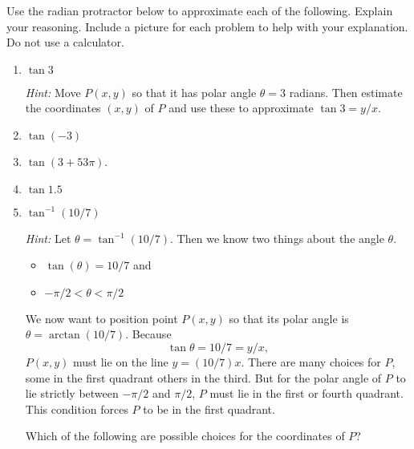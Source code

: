 \documentclass{ximera}
\begin{document}
\begin{question} \label{Q10:InverseTrig}
Use the radian protractor below to approximate each of the following. Explain your reasoning. Include a picture for each problem to help with your explanation. Do not use a calculator.

\begin{enumerate}

\item $\tan 3$

\emph{Hint: } Move $P(x,y)$ so that it has polar angle $\theta =3$ radians. Then estimate the coordinates $(x,y)$ of $P$ and use these to approximate $\tan 3 = y/x$.

\item $\tan (-3)$

\item $\tan (3+53\pi)$.

\item $\tan 1.5$

\item $\tan^{-1}(10/7)$

\emph{Hint: } Let $\theta = \tan^{-1}(10/7)$. Then we know two things about the angle $\theta$.
\begin{itemize}
\item{$\tan (\theta) = 10/7$ and}

\item{$-\pi/2 < \theta <\pi/2$}

\end{itemize}

We now want to position point $P(x,y)$ so that its polar angle is $\theta = \arctan(10/7)$. Because 
\[
 \tan\theta = 10/7 = y/x ,
\]
$P(x,y)$ must lie on the line $y=(10/7)x$. There are many choices for $P$, some in the first quadrant others in the third. But for 
the polar angle of $P$ to lie strictly between $-\pi/2$ and $\pi/2$, $P$ must lie in the first or fourth quadrant. This condition forces $P$ to be in the first quadrant.


\begin{question}  \label{Q35445fg}
Which of the following are possible choices for the coordinates of $P$?
\begin{multipleChoice}  
\end{multipleChoice}   
\end{question}


\end{enumerate}
\end{question}
\end{document}
